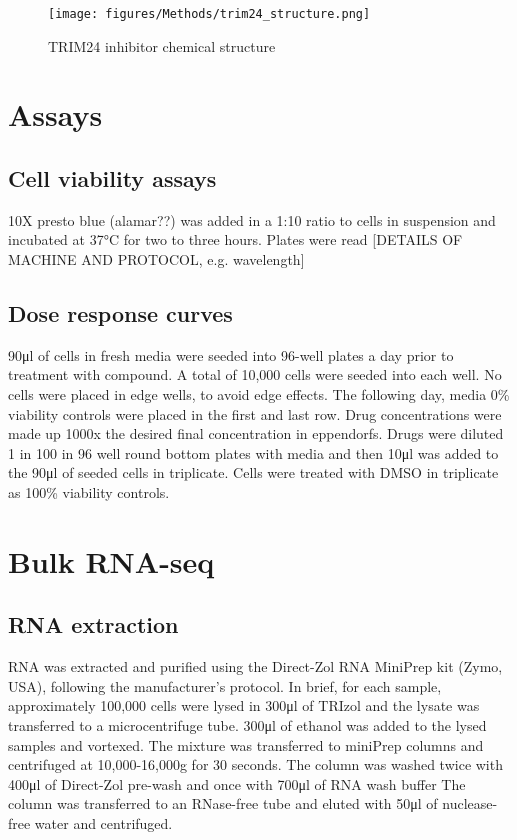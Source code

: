 \begin{figure}[htb]
\centering
\texttt{[image: figures/Methods/trim24\_structure.png]}
\caption[TRIM24i structure]{TRIM24 inhibitor chemical structure}
\label{fig:trim24_structure}
\end{figure}

\section{Assays}
\subsection{Cell viability assays}
10X presto blue (alamar??) was added in a 1:10 ratio to cells in suspension and incubated at 37\si{\degreeCelsius} for two to three hours.
Plates were read [DETAILS OF MACHINE AND PROTOCOL, e.g. wavelength]

\subsection{Dose response curves}
90\si{\micro\litre} of cells in fresh media were seeded into 96-well plates a day prior to treatment with compound.
A total of 10,000 cells were seeded into each well.
No cells were placed in edge wells, to avoid edge effects.
The following day, media 0\% viability controls were placed in the first and last row.
Drug concentrations were made up 1000x the desired final concentration in eppendorfs.
Drugs were diluted 1 in 100 in 96 well round bottom plates with media and then 10\si{\micro\litre} was added to the 90\si{\micro\litre} of seeded cells in triplicate.
Cells were treated with DMSO in triplicate as 100\% viability controls.

\section{Bulk RNA-seq}
\subsection{RNA extraction}
RNA was extracted and purified using the Direct-Zol RNA MiniPrep kit (Zymo, USA), following the manufacturer's protocol.
In brief, for each sample, approximately 100,000 cells were lysed in 300\si{\ul} of TRIzol and the lysate was transferred to a microcentrifuge tube.
300\si{\ul} of ethanol was added to the lysed samples and vortexed.
The mixture was transferred to miniPrep columns and centrifuged at 10,000-16,000g for 30 seconds.
The column was washed twice with 400\si{\ul} of Direct-Zol pre-wash and once with 700\si{\micro\litre} of RNA wash buffer
The column was transferred to an RNase-free tube and eluted with 50\si{\ul} of nuclease-free water and centrifuged.

